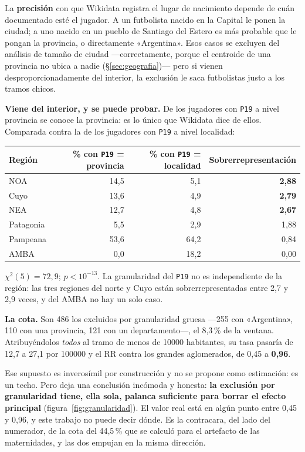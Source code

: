 \documentclass[11pt,a4paper]{article}
\begin{document}
La \textbf{precisión} con que Wikidata registra el lugar de nacimiento depende de
cuán documentado esté el jugador. A un futbolista nacido en la Capital le ponen la
ciudad; a uno nacido en un pueblo de Santiago del Estero es más probable que le
pongan la provincia, o directamente «Argentina». Esos casos se excluyen del
análisis de tamaño de ciudad —correctamente, porque el centroide de una provincia
no ubica a nadie (§\ref{sec:geografia})— pero si vienen desproporcionadamente del
interior, la exclusión le saca futbolistas justo a los tramos chicos.

\textbf{Viene del interior, y se puede probar.} De los jugadores con \texttt{P19}
a nivel provincia se conoce la provincia: es lo único que Wikidata dice de ellos.
Comparada contra la de los jugadores con \texttt{P19} a nivel localidad:

\begin{center}\small
\begin{tabular}{@{}lrrr@{}}
\toprule
\textbf{Región} & \textbf{\% con \texttt{P19} = provincia} &
\textbf{\% con \texttt{P19} = localidad} & \textbf{Sobrerrepresentación}\\
\midrule
NOA       & 14,5 &  5,1 & \textbf{2,88}\\
Cuyo      & 13,6 &  4,9 & \textbf{2,79}\\
NEA       & 12,7 &  4,8 & \textbf{2,67}\\
Patagonia &  5,5 &  2,9 & 1,88\\
Pampeana  & 53,6 & 64,2 & 0,84\\
AMBA      &  0,0 & 18,2 & 0,00\\
\bottomrule
\end{tabular}
\end{center}

$\chi^2(5) = 72{,}9$; $p < 10^{-13}$. La granularidad del \texttt{P19} no es
independiente de la región: las tres regiones del norte y Cuyo están
sobrerrepresentadas entre 2,7 y 2,9 veces, y del AMBA no hay un solo caso.

\textbf{La cota.} Son 486 los excluidos por granularidad gruesa —255 con
«Argentina», 110 con una provincia, 121 con un departamento—, el 8,3\,\% de la
ventana. Atribuyéndolos \emph{todos} al tramo de menos de \num{10000} habitantes,
su tasa pasaría de 12,7 a 27,1 por \num{100000} y el RR contra los grandes
aglomerados, de 0,45 a \textbf{0,96}.

Ese supuesto es inverosímil por construcción y no se propone como estimación: es
un techo. Pero deja una conclusión incómoda y honesta: \textbf{la exclusión por
granularidad tiene, ella sola, palanca suficiente para borrar el efecto
principal} (figura~\ref{fig:granularidad}). El valor real está en algún punto
entre 0,45 y 0,96, y este trabajo no puede decir dónde. Es la contracara, del
lado del numerador, de la cota del 44,5\,\% que se calculó para el artefacto de
las maternidades, y las dos empujan en la misma dirección.
\end{document}
